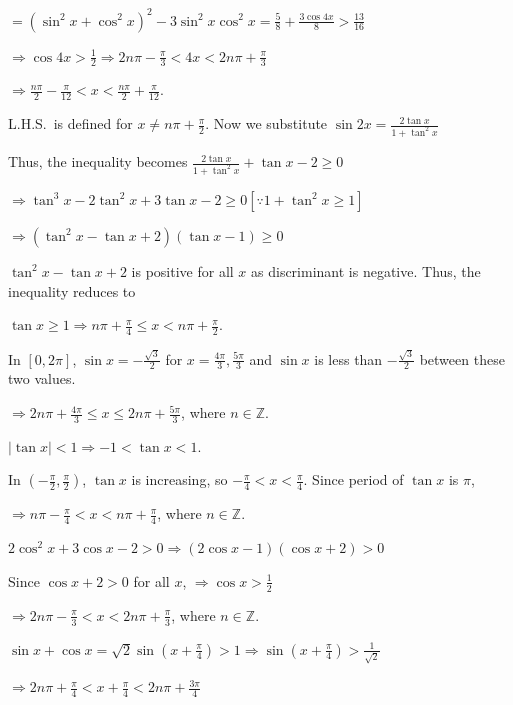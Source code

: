   $= \left(\sin^2x + \cos^2x\right)^2 - 3\sin^2x\cos^2x = \frac{5}{8} + \frac{3\cos4x}{8} > \frac{13}{16}$

  $\Rightarrow \cos 4x > \frac{1}{2}\Rightarrow 2n\pi - \frac{\pi}{3} < 4x < 2n\pi + \frac{\pi}{3}$

  $\Rightarrow \frac{n\pi}{2} - \frac{\pi}{12} < x < \frac{n\pi}{2} + \frac{\pi}{12}$.
\item L.H.S.\ is defined for $x\neq n\pi + \frac{\pi}{2}$. Now we substitute $\sin2x = \frac{2\tan x}{1 +
  \tan^2x}$

  Thus, the inequality becomes $\frac{2\tan x}{1 + \tan^2x} + \tan x - 2\geq 0$

  $\Rightarrow \tan^3x - 2\tan^2x + 3\tan x - 2\geq 0[\because 1 + \tan^2x \geq 1]$

  $\Rightarrow \left(\tan^2x - \tan x + 2\right)(\tan x - 1)\geq 0$

  $\tan^2x - \tan x + 2$ is positive for all $x$ as discriminant is negative. Thus, the inequality reduces
  to

  $\tan x \geq 1\Rightarrow n\pi + \frac{\pi}{4}\leq x < n\pi + \frac{\pi}{2}$.
\item In $[0, 2\pi]$, $\sin x = -\frac{\sqrt{3}}{2}$ for $x = \frac{4\pi}{3}, \frac{5\pi}{3}$ and $\sin x$ is
  less than $-\frac{\sqrt{3}}{2}$ between these two values.

  $\Rightarrow 2n\pi + \frac{4\pi}{3}\leq x\leq 2n\pi + \frac{5\pi}{3}$, where $n\in\mathbb{Z}$.
\item $|\tan x| < 1\Rightarrow -1 < \tan x < 1$.

  In $\left(-\frac{\pi}{2}, \frac{\pi}{2}\right)$, $\tan x$ is increasing, so $-\frac{\pi}{4} < x <
  \frac{\pi}{4}$. Since period of $\tan x$ is $\pi$,

  $\Rightarrow n\pi - \frac{\pi}{4} < x < n\pi + \frac{\pi}{4}$, where $n\in\mathbb{Z}$.
\item $2\cos^2x + 3\cos x - 2 > 0\Rightarrow (2\cos x - 1)(\cos x + 2) > 0$

  Since $\cos x + 2 > 0$ for all $x$, $\Rightarrow \cos x > \frac{1}{2}$

  $\Rightarrow 2n\pi - \frac{\pi}{3} < x < 2n\pi + \frac{\pi}{3}$, where $n\in\mathbb{Z}$.
\item $\sin x + \cos x = \sqrt{2}\sin\left(x + \frac{\pi}{4}\right) > 1\Rightarrow \sin\left(x +
  \frac{\pi}{4}\right) > \frac{1}{\sqrt{2}}$

  $\Rightarrow 2n\pi + \frac{\pi}{4} < x + \frac{\pi}{4} < 2n\pi + \frac{3\pi}{4}$

